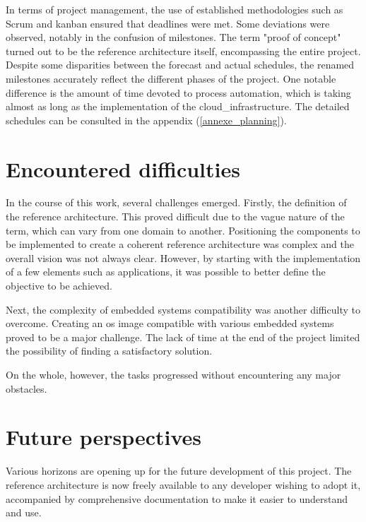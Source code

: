 In terms of project management, the use of established methodologies such as Scrum and \gls{kanban} ensured that deadlines were met. Some deviations were observed, notably in the confusion of milestones. The term "proof of concept" turned out to be the reference architecture itself, encompassing the entire project. Despite some disparities between the forecast and actual schedules, the renamed milestones accurately reflect the different phases of the project. One notable difference is the amount of time devoted to process automation, which is taking almost as long as the implementation of the \gls{cloud_infrastructure}. The detailed schedules can be consulted in the appendix (\ref{annexe_planning}).

\section{Encountered difficulties}

In the course of this work, several challenges emerged. Firstly, the definition of the reference architecture. This proved difficult due to the vague nature of the term, which can vary from one domain to another. Positioning the components to be implemented to create a coherent reference architecture was complex and the overall vision was not always clear. However, by starting with the implementation of a few elements such as applications, it was possible to better define the objective to be achieved.

Next, the complexity of embedded systems compatibility was another difficulty to overcome. Creating an \acrshort{os} image compatible with various embedded systems proved to be a major challenge. The lack of time at the end of the project limited the possibility of finding a satisfactory solution.

On the whole, however, the tasks progressed without encountering any major obstacles.

\section{Future perspectives}

Various horizons are opening up for the future development of this project. The reference architecture is now freely available to any developer wishing to adopt it, accompanied by comprehensive documentation to make it easier to understand and use.

